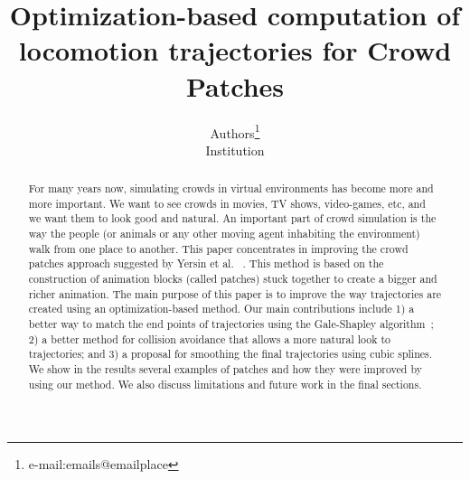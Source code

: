 \documentclass[review]{acmsiggraph}
\title{Optimization-based computation of locomotion trajectories for Crowd Patches}
\author{Authors\thanks{e-mail:emails@emailplace}\\Institution}
\begin{document}

\maketitle

\begin{abstract}

For many years now, simulating crowds in virtual environments has become more and more important. We want to see crowds in movies, TV shows, video-games, etc, and we want them to look good and natural.  An important part of crowd simulation is the way the people (or animals or any other moving agent inhabiting the environment) walk from one place to another. This paper concentrates in improving the crowd patches approach suggested by Yersin et al. ~\cite{Yersin:2009}. This method is based on the construction of animation blocks (called patches) stuck together to create a bigger and richer animation. The main purpose of this paper is to improve the way trajectories are created using an optimization-based method. Our main contributions include 1) a better way to match the end points of trajectories using the Gale-Shapley algorithm~\cite{gale1962college}; 2) a better method for collision avoidance that allows a more natural look to trajectories; and 3) a proposal for smoothing the final trajectories using cubic splines. We show in the results several examples of patches and how they were improved by using our method. We also discuss limitations and future work in the final sections.




\end{abstract}

\begin{CRcatlist}
\end{CRcatlist}
\end{document}
